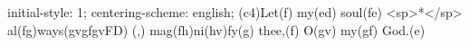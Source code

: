 initial-style: 1;
centering-scheme: english;
(c4)Let(f) my(ed) soul(fe) <sp>*</sp> al(fg)ways(gvgfgvFD) (,) mag(fh)ni(hv)fy(g) thee,(f) O(gv) my(gf) God.(e)
